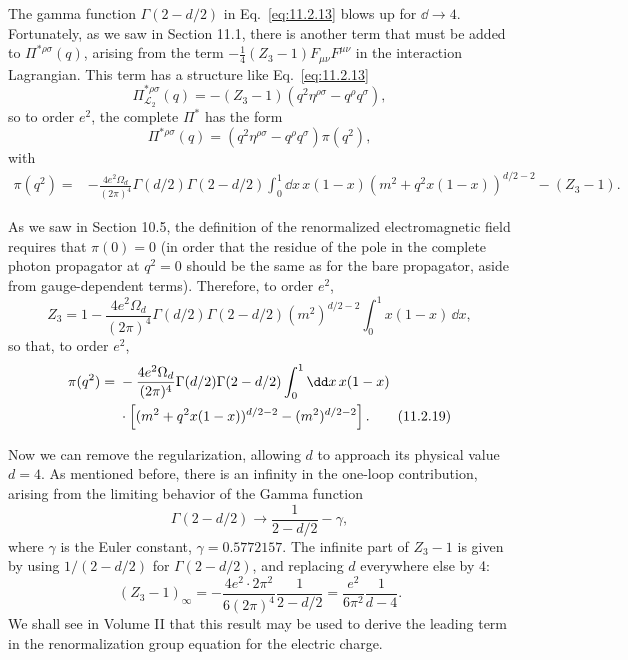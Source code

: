 The gamma function $\Gamma(2-d/2)$ in Eq.~\eqref{eq:11.2.13} blows up for
$\dd\to4$. Fortunately, as we saw in Section 11.1, there is another term that
must be added to $\Pi^{*\rho\sigma}(q)$, arising from the term
$-\tfrac14(Z_3-1)F_{\mu\nu}F^{\mu\nu}$ in the interaction Lagrangian.
This term has a structure like Eq.~\eqref{eq:11.2.13}
\begin{equation}
  \Pi_{\mathcal L_2}^{*\rho\sigma}(q)
  =-(Z_3-1)(q^2\eta^{\rho\sigma}-q^\rho q^\sigma),
  \tag{11.2.15}\label{eq:11.2.15}
\end{equation}
so to order $e^2$, the complete $\Pi^*$ has the form
\begin{equation}
  \Pi^{*\rho\sigma}(q)=(q^2\eta^{\rho\sigma}-q^\rho q^\sigma)\pi(q^2),
  \tag{11.2.16}\label{eq:11.2.16}
\end{equation}
with
\begin{align}
  \pi(q^2)={}&-\frac{4e^2\Omega_d}{(2\pi)^4}
  \Gamma(d/2)\Gamma(2-d/2)\int_0^1\dd x\,x(1-x)
  (m^2+q^2x(1-x))^{d/2-2}
  -(Z_3-1).
  \tag{11.2.17}\label{eq:11.2.17}
\end{align}

As we saw in Section 10.5, the definition of the renormalized
electromagnetic field requires that $\pi(0)=0$ (in order that the residue
of the pole in the complete photon propagator at $q^2=0$ should be the
same as for the bare propagator, aside from gauge-dependent terms).
Therefore, to order $e^2$,
\begin{equation}
  Z_3=1-\frac{4e^2\Omega_d}{(2\pi)^4}\Gamma(d/2)\Gamma(2-d/2)
  (m^2)^{d/2-2}\int_0^1x(1-x)\,\dd x,
  \tag{11.2.18}\label{eq:11.2.18}
\end{equation}
so that, to order $e^2$,
\begin{align}
  \pi(q^2)={}&-\frac{4e^2\Omega_d}{(2\pi)^4}
  \Gamma(d/2)\Gamma(2-d/2)\int_0^1\dd x\,x(1-x)\notag\\
  &\cdot\left[(m^2+q^2x(1-x))^{d/2-2}-(m^2)^{d/2-2}\right].
  \tag{11.2.19}\label{eq:11.2.19}
\end{align}

Now we can remove the regularization, allowing $d$ to approach its
physical value $d=4$. As mentioned before, there is an infinity in the
one-loop contribution, arising from the limiting behavior of the Gamma
function
\[
  \Gamma(2-d/2)\longrightarrow\frac1{2-d/2}-\gamma,
\]
where $\gamma$ is the Euler constant, $\gamma=0.5772157$. The infinite part
of $Z_3-1$ is given by using $1/(2-d/2)$ for $\Gamma(2-d/2)$, and
replacing $d$ everywhere else by 4:
\begin{equation}
  (Z_3-1)_\infty
  =-\frac{4e^2\cdot2\pi^2}{6(2\pi)^4}\frac1{2-d/2}
  =\frac{e^2}{6\pi^2}\frac1{d-4}.
  \tag{11.2.20}\label{eq:11.2.20}
\end{equation}
We shall see in Volume II that this result may be used to derive the leading
term in the renormalization group equation for the electric charge.

